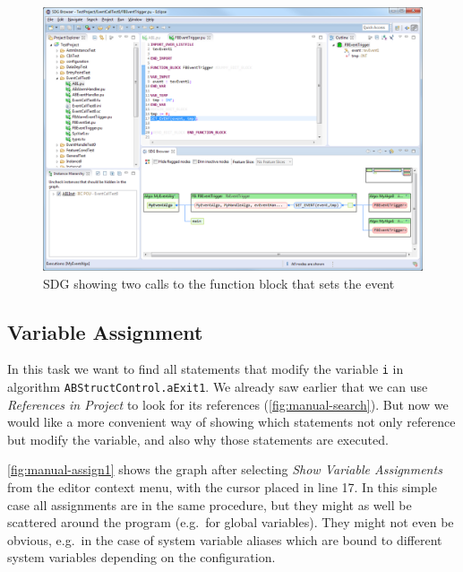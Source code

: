 \begin{figure}[p]
  \centering
    \includegraphics[width=\textwidth]{bilder/manual-event2}
  \caption{SDG showing two calls to the function block that sets the event}
  \label{fig:manual-event2}
\end{figure}

\subsection*{Variable Assignment}

In this task we want to find all statements that modify the variable \lstinline|i| in algorithm 
\lstinline|ABStructControl.aExit1|. We already saw earlier that we can use \emph{References in Project} to look for its 
references (\autoref{fig:manual-search}). But now we would like a more convenient way of showing which statements not 
only reference but modify the variable, and also why those statements are executed.

\autoref{fig:manual-assign1} shows the graph after selecting \emph{Show Variable Assignments} from the editor context 
menu, with the cursor placed in line 17. In this simple case all assignments are in the same procedure, but they might 
as well be scattered around the program (e.g.\ for global variables). They might not even be obvious, e.g.\ in the case 
of system variable aliases which are bound to different system variables depending on the configuration.

